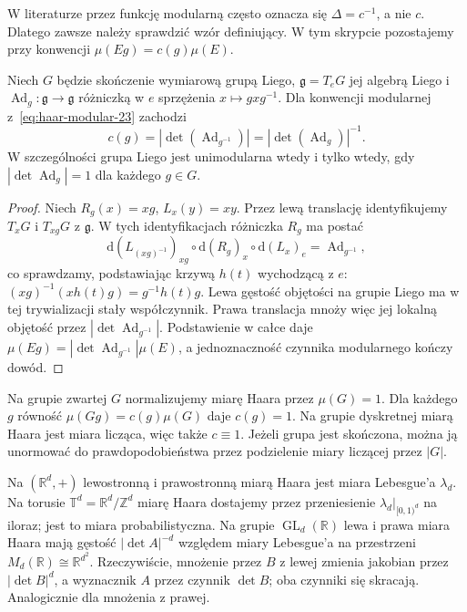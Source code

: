 \begin{uwaga}
W literaturze przez funkcję modularną często oznacza
się $\Delta=c^{-1}$, a nie $c$. Dlatego zawsze
należy sprawdzić wzór definiujący. W tym skrypcie
pozostajemy przy konwencji
$\mu(Eg)=c(g)\mu(E)$.
\end{uwaga}

\begin{wniosek}
\label{cor:haar-adjoint-23}
Niech $G$ będzie skończenie wymiarową grupą Liego,
$\mathfrak g=T_eG$ jej algebrą Liego i
$\operatorname{Ad}_g:\mathfrak g\to\mathfrak g$
różniczką w $e$ sprzężenia $x\mapsto gxg^{-1}$.
Dla konwencji modularnej z~\eqref{eq:haar-modular-23}
zachodzi
\[
 c(g)=|\det(\operatorname{Ad}_{g^{-1}})|
       =|\det(\operatorname{Ad}_{g})|^{-1}.
\]
W szczególności grupa Liego jest unimodularna wtedy
i tylko wtedy, gdy $|\det\operatorname{Ad}_g|=1$
dla każdego $g\in G$.
\end{wniosek}
\begin{proof}
Niech $R_g(x)=xg$, $L_x(y)=xy$.
Przez lewą translację identyfikujemy $T_xG$ i
$T_{xg}G$ z $\mathfrak g$. W tych identyfikacjach
różniczka $R_g$ ma postać
\[
 \mathrm d(L_{(xg)^{-1}})_{xg}\circ
 \mathrm d(R_g)_x\circ\mathrm d(L_x)_e
 =\operatorname{Ad}_{g^{-1}},
\]
co sprawdzamy, podstawiając krzywą $h(t)$ wychodzącą
z $e$: $(xg)^{-1}(xh(t)g)=g^{-1}h(t)g$.
Lewa gęstość objętości na grupie Liego ma w tej
trywializacji stały współczynnik. Prawa translacja
mnoży więc jej lokalną objętość przez
$|\det\operatorname{Ad}_{g^{-1}}|$.
Podstawienie w całce daje
$\mu(Eg)=|\det\operatorname{Ad}_{g^{-1}}|\mu(E)$,
a jednoznaczność czynnika modularnego kończy dowód.
\end{proof}

\begin{przyklad}
\label{ex:haar-compact-discrete-23}
Na grupie zwartej $G$ normalizujemy miarę Haara
przez $\mu(G)=1$. Dla każdego $g$ równość
$\mu(Gg)=c(g)\mu(G)$ daje $c(g)=1$.
Na grupie dyskretnej miarą Haara jest miara licząca,
więc także $c\equiv1$. Jeżeli grupa jest skończona,
można ją unormować do prawdopodobieństwa przez
podzielenie miary liczącej przez $|G|$.
\end{przyklad}

\begin{przyklad}
\label{ex:haar-standard-23}
Na $(\mathbb R^d,+)$ lewostronną i prawostronną miarą
Haara jest miara Lebesgue'a $\lambda_d$.
Na torusie $\mathbb T^d=\mathbb R^d/\mathbb Z^d$
miarę Haara dostajemy przez przeniesienie
$\lambda_d|_{[0,1)^d}$ na iloraz; jest to miara
probabilistyczna. Na grupie
$\operatorname{GL}_d(\mathbb R)$ lewa i prawa miara Haara
mają gęstość $|\det A|^{-d}$ względem miary
Lebesgue'a na przestrzeni $M_d(\mathbb R)\cong\mathbb R^{d^2}$.
Rzeczywiście, mnożenie przez $B$ z lewej zmienia
jakobian przez $|\det B|^d$, a wyznacznik $A$
przez czynnik $\det B$; oba czynniki się skracają.
Analogicznie dla mnożenia z prawej.
\end{przyklad}

